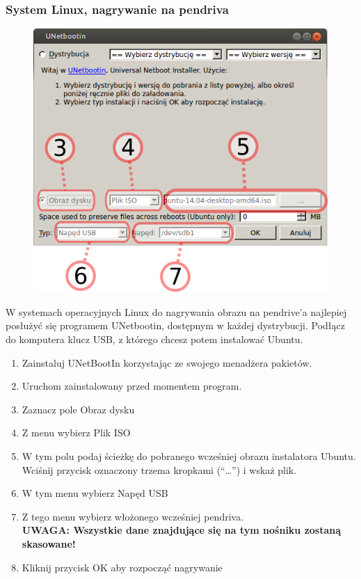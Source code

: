 \subsubsection{System Linux, nagrywanie na pendriva}
\begin{figure}
              \includegraphics[width=\linewidth]{images/instalacja_nagrywanie_obrazu_linux.png}
\end{figure}

W systemach operacyjnych Linux do nagrywania obrazu na pendrive'a najlepiej posłużyć się programem \textcolor{ubuntu_orange}{UNetbootin}, dostępnym w każdej dystrybucji. Podłącz do komputera klucz USB, z którego chcesz potem instalować Ubuntu.
\begin{enumerate}[label=\protect\circled{\arabic*}]
\item Zainstaluj UNetBootIn korzystając ze swojego menadżera pakietów.
\item Uruchom zainstalowany przed momentem program.
\item Zaznacz pole Obraz dysku
\item Z menu wybierz Plik ISO
\item W tym polu podaj ścieżkę do pobranego wcześniej obrazu instalatora Ubuntu. Wciśnij przycisk oznaczony trzema kropkami (“\ldots”) i wskaż plik.
\item W tym menu wybierz Napęd USB
\item Z tego menu wybierz włożonego wcześniej pendriva.\\
\textbf{UWAGA: Wszystkie dane znajdujące się na tym nośniku zostaną skasowane!}
\item Kliknij przycisk OK aby rozpocząć nagrywanie
\end{enumerate}
